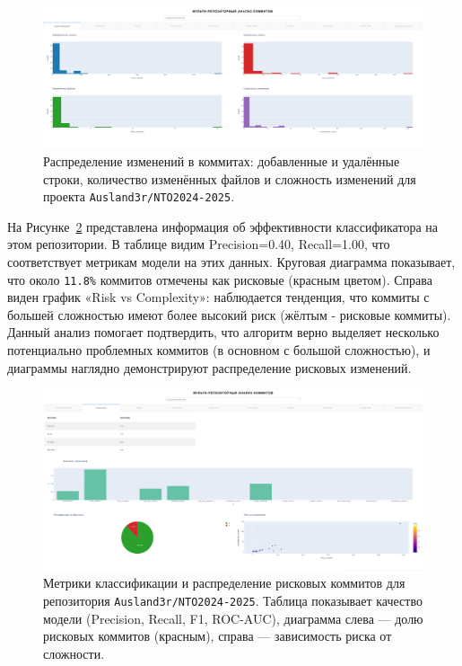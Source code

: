 \begin{itemize}
 \begin{figure}[H]
	\centering
	\includegraphics[width=\textwidth]{my_folder/images/first_page.png}
	\caption{Распределение изменений в коммитах: добавленные и удалённые строки, количество изменённых файлов и сложность изменений для проекта \texttt{Ausland3r/NTO2024-2025}.}
	\label{fig:commit_stats}
\end{figure}
На Рисунке~\ref{fig:risk_analysis} представлена информация об эффективности классификатора на этом репозитории. В таблице видим Precision=0.40, Recall=1.00, что соответствует метрикам модели на этих данных. Круговая диаграмма показывает, что около \verb|11.8%| коммитов отмечены как рисковые (красным цветом). Справа виден график «Risk vs Complexity»: наблюдается тенденция, что коммиты с большей сложностью имеют более высокий риск (жёлтым - рисковые коммиты). Данный анализ помогает подтвердить, что алгоритм верно выделяет несколько потенциально проблемных коммитов (в основном с большой сложностью), и диаграммы наглядно демонстрируют распределение рисковых изменений.

\begin{figure}[H]
	\centering
	\includegraphics[width=\textwidth]{my_folder/images/second_page.png}
	\caption{Метрики классификации и распределение рисковых коммитов для репозитория \texttt{Ausland3r/NTO2024-2025}. Таблица показывает качество модели (Precision, Recall, F1, ROC-AUC), диаграмма слева — долю рисковых коммитов (красным), справа — зависимость риска от сложности.}
	\label{fig:risk_analysis}
\end{figure}


\end{itemize}
